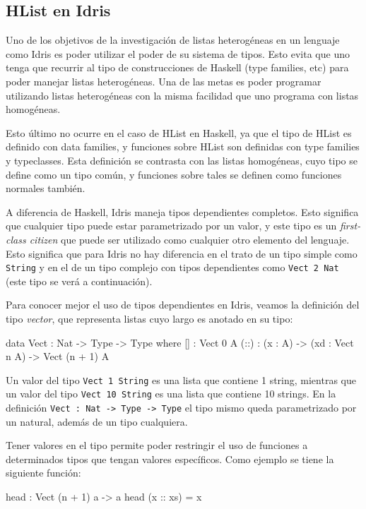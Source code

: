 \subsection{HList en Idris}

Uno de los objetivos de la investigación de listas heterogéneas en un lenguaje como Idris es poder utilizar el poder de su sistema de tipos. Esto evita que uno tenga que recurrir al tipo de construcciones de Haskell (type families, etc) para poder manejar listas heterogéneas. Una de las metas es poder programar utilizando listas heterogéneas con la misma facilidad que uno programa con listas homogéneas.

Esto último no ocurre en el caso de HList en Haskell, ya que el tipo de HList es definido con data families, y funciones sobre HList son definidas con type families y typeclasses. Esta definición se contrasta con las listas homogéneas, cuyo tipo se define como un tipo común, y funciones sobre tales se definen como funciones normales también.

A diferencia de Haskell, Idris maneja tipos dependientes completos. Esto significa que cualquier tipo puede estar parametrizado por un valor, y este tipo es un \textit{first-class citizen} que puede ser utilizado como cualquier otro elemento del lenguaje. Esto significa que para Idris no hay diferencia en el trato de un tipo simple como \texttt{String} y en el de un tipo complejo con tipos dependientes como \texttt{Vect 2 Nat} (este tipo se verá a continuación).

Para conocer mejor el uso de tipos dependientes en Idris, veamos la definición del tipo \textit{vector}, que representa listas cuyo largo es anotado en su tipo:

\begin{code}
data Vect : Nat -> Type -> Type where
  [] : Vect 0 A
  (::) : (x : A) -> (xd : Vect n A) -> Vect (n + 1) A
\end{code}

Un valor del tipo \texttt{Vect 1 String} es una lista que contiene 1 string, mientras que un valor del tipo \texttt{Vect 10 String} es una lista que contiene 10 strings. En la definición \texttt{Vect : Nat -> Type -> Type} el tipo mismo queda parametrizado por un natural, además de un tipo cualquiera.

Tener valores en el tipo permite poder restringir el uso de funciones a determinados tipos que tengan valores específicos. Como ejemplo se tiene la siguiente función:

\begin{code}
head : Vect (n + 1) a -> a
head (x :: xs) = x
\end{code}

